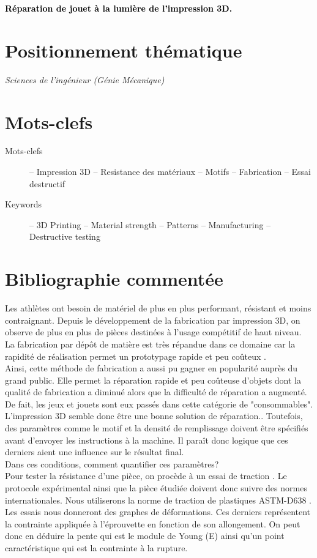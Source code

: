 \documentclass[12pt, french]{article}
\newcommand{\motclefs}[2]{
\section*{Mots-clefs}
\begin{description}
\item[Mots-clefs] -- #1 
\item[Keywords]   -- #2
\end{description}
}
\newcommand{\positionnementThematique}[1]{
\section*{Positionnement thématique}
{\it #1}}
\newcommand{\Titre}[1]{
\noindent
\textcolor{black}{\Huge\textbf{\textsf{#1}}}
\vspace*{0.75cm}
}
\begin{document}
\Titre{Réparation de jouet à la lumière de l'impression 3D.}

\positionnementThematique{Sciences de l'ingénieur (Génie Mécanique)}

\motclefs{Impression 3D -- Resistance des matériaux -- Motifs -- Fabrication -- Essai destructif}{3D Printing -- Material strength -- Patterns -- Manufacturing -- Destructive testing}

\section*{Bibliographie commentée}

Les athlètes ont besoin de matériel de plus en plus performant, résistant et moins contraignant.
Depuis le développement de la fabrication par impression 3D, on observe de plus en plus de pièces destinées à l'usage compétitif de haut niveau. \cite{sports} \\

La fabrication par dépôt de matière est très répandue dans ce domaine car la rapidité de réalisation permet un prototypage rapide et peu coûteux \cite{sports}.\\

 Ainsi, cette méthode de fabrication a aussi pu gagner en popularité auprès du grand public. Elle permet la réparation rapide et peu coûteuse \cite{moula} d'objets dont la qualité de fabrication a diminué alors que la difficulté de réparation a augmenté. De fait, les jeux et jouets sont eux passés dans cette catégorie de "consommables".  \\
 
 L'impression 3D semble donc être une bonne solution de réparation.\cite{toys}. Toutefois, des paramètres comme le motif et la densité de remplissage doivent être spécifiés avant d'envoyer les instructions à la machine.
  Il paraît donc logique que ces derniers aient une influence sur le résultat final.\\ Dans ces conditions, comment quantifier ces paramètres?\\
 
Pour tester la résistance d'une pièce, on procède à un essai de traction \cite{tensiletestd638}. Le protocole expérimental ainsi que la pièce étudiée doivent donc suivre des normes internationales. Nous utiliserons la norme de traction de plastiques ASTM-D638 \cite{ASTMD638}.\\

 Les essais nous donneront des graphes de déformations. Ces derniers représentent la contrainte appliquée à l'éprouvette en fonction de son allongement. On peut donc en déduire la pente qui est le module de Young (E) \cite{rdm} ainsi qu'un point caractéristique qui est la contrainte à la rupture.\\ 
\end{document}

